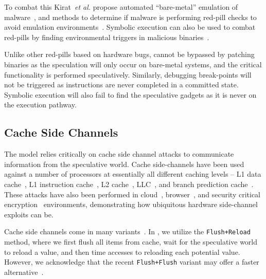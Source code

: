 To combat this Kirat~\textit{et al.} propose automated ``bare-metal''
emulation of malware~\cite{kirat2011barebox}, and methods to determine if malware
is performing red-pill checks to avoid emulation environments~\cite{kirat2014barecloud}.
Symbolic execution can also be used to combat red-pills by finding environmental triggers 
in malicious binaries~\cite{schwartz2010all}. 

\smallskip

Unlike other red-pills based on hardware bugs, \speculake cannot be bypassed
by patching binaries as the speculation will only occur on bare-metal systems, 
and the critical functionality is performed speculatively. Similarly, debugging 
break-points will not be triggered as instructions are never completed in a committed state.
Symbolic execution will also fail to find the speculative gadgets as it is never on the
execution pathway.



\subsection{Cache Side Channels}

The \speculake model relies critically on cache side channel attacks to 
communicate information from the speculative world. Cache side-channels have 
been used against a number of processors at essentially all different 
caching levels -- L1 data cache~\cite{percival2005cache,zhang2012cross,osvik2006cache}, 
L1 instruction cache~\cite{aciiccmez2010new}, 
L2 cache~\cite{ristenpart2009hey,percival2005cache}, 
LLC~\cite{ristenpart2009hey,liu2015last}, 
and branch prediction cache~\cite{aciiccmez2007power}. 
These attacks have also been performed in 
cloud~\cite{ristenpart2009hey,zhang2012cross}, 
browser~\cite{oren2015spy,google_cache_browser},
and security critical encryption~\cite{yarom2014recovering,tromer2010efficient}
environments, demonstrating how ubiquitous hardware side-channel exploits can be. 

Cache side channels come in many
variants~\cite{neve2006refined,tromer2010efficient,yarom2014flush+,gruss2016flush+flush}.
In \speculake, we utilize the \texttt{Flush+Reload} method, where we first flush
all items from cache, wait for the speculative world to reload a value, and then
time accesses to reloading each potential value. However, we acknowledge that
the recent \texttt{Flush+Flush} variant may offer a
faster alternative~\cite{gruss2016flush+flush}.

